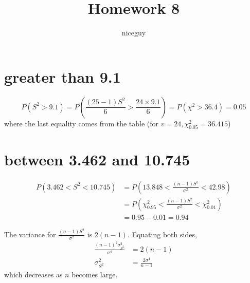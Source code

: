 \documentclass[answers]{exam}
\author{niceguy}
\title{Homework 8}
\begin{document}
\maketitle

\begin{questions}


\begin{parts}
	\part{greater than 9.1}

	\begin{solution}
		$$P(S^2>9.1) = P\left(\frac{(25-1)S^2}{6} > \frac{24\times9.1}{6}\right) = P(\chi^2 > 36.4) = 0.05$$
		where the last equality comes from the table (for $v=24,\chi_{0.05}^2 = 36.415$)
	\end{solution}

	\part{between 3.462 and 10.745}

	\begin{solution}
		\begin{align*}
			P(3.462<S^2<10.745) &= P\left(13.848 < \frac{(n-1)S^2}{\sigma^2} < 42.98\right) \\
					    &= P\left(\chi_{0.95}^2 < \frac{(n-1)S^2}{\sigma^2} < \chi_{0.01}^2\right) \\
					    &= 0.95-0.01 = 0.94
		\end{align*}
	\end{solution}
	
\end{parts}


\begin{solution}
	The variance for $\frac{(n-1)S^2}{\sigma^2}$ is $2(n-1)$. Equating both sides,
	\begin{align*}
		\frac{(n-1)^2\sigma^2_{S^2}}{\sigma^4} &= 2(n-1) \\
		\sigma^2_{S^2} &= \frac{2\sigma^4}{n-1}
	\end{align*}
	which decreases as $n$ becomes large.
\end{solution}


\end{questions}
\end{document}
